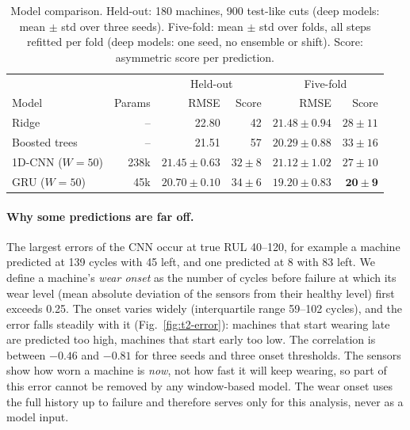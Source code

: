 \begin{table}[t]
  \centering
  \caption{Model comparison. Held-out: 180 machines, 900 test-like cuts (deep models: mean $\pm$ std
  over three seeds). Five-fold: mean $\pm$ std over folds, all steps refitted per fold (deep models:
  one seed, no ensemble or shift). Score: asymmetric score per prediction.}
  \label{tab:t2-models}
  \small
  \begin{tabular}{lrrrrr}
    \toprule
    & & \multicolumn{2}{c}{Held-out} & \multicolumn{2}{c}{Five-fold} \\
    Model & Params & RMSE & Score & RMSE & Score \\
    \midrule
    Ridge                 & --   & 22.80            & 42         & $21.48 \pm 0.94$ & $28 \pm 11$ \\
    Boosted trees         & --   & 21.51            & 57         & $20.29 \pm 0.88$ & $33 \pm 16$ \\
    1D-CNN ($W=50$)       & 238k & $21.45 \pm 0.63$ & $32 \pm 8$ & $21.12 \pm 1.02$ & $27 \pm 10$ \\
    GRU ($W=50$)          & 45k  & $\mathbf{20.70 \pm 0.10}$ & $34 \pm 6$ & $\mathbf{19.20 \pm 0.83}$ & $\mathbf{20 \pm 9}$ \\
    \bottomrule
  \end{tabular}
\end{table}

\paragraph{Why some predictions are far off.} The largest errors of the CNN occur at true RUL 40--120,
for example a machine predicted at 139 cycles with 45 left, and one predicted at 8 with 83 left. We
define a machine's \emph{wear onset} as the number of cycles before failure at which its wear level
(mean absolute deviation of the sensors from their healthy level) first exceeds 0.25. The onset varies
widely (interquartile range 59--102 cycles), and the error falls steadily with it
(Fig.~\ref{fig:t2-error}): machines that start wearing late are predicted too high, machines that
start early too low. The correlation is between $-0.46$ and $-0.81$ for three seeds and three onset
thresholds. The sensors show how worn a machine is \emph{now}, not how fast it will keep wearing, so
part of this error cannot be removed by any window-based model. The wear onset uses the full history
up to failure and therefore serves only for this analysis, never as a model input.

